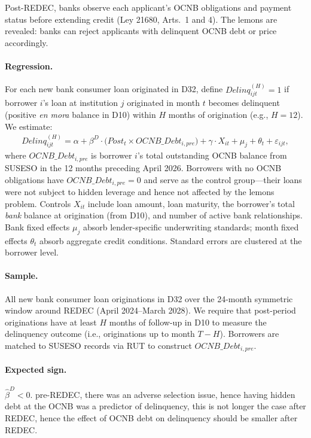 \documentclass[12pt]{article}
\theoremstyle{plain}
\theoremstyle{plain}
\begin{document}
Post-REDEC, banks observe each applicant's OCNB obligations and payment status before extending credit (Ley 21680, Arts.\ 1 and 4). The lemons are revealed: banks can reject applicants with delinquent OCNB debt or price accordingly.

\paragraph{Regression.}  For each new bank consumer loan originated in D32, define $Delinq_{ijt}^{(H)} = 1$ if borrower $i$'s loan at institution $j$ originated in month $t$ becomes delinquent (positive \textit{en mora} balance in D10) within $H$ months of origination (e.g., $H = 12$). We estimate:
\begin{align}
    Delinq_{ijt}^{(H)} = \alpha + \beta^{D} \cdot \bigl(Post_t \times OCNB\_Debt_{i,pre}\bigr) + \gamma \cdot X_{it} + \mu_j + \theta_t + \varepsilon_{ijt},
\label{eq:delinquency}
\end{align}
where $OCNB\_Debt_{i,pre}$ is borrower $i$'s total outstanding OCNB balance from SUSESO in the 12 months preceding April 2026. Borrowers with no OCNB obligations have $OCNB\_Debt_{i,pre} = 0$ and serve as the control group---their loans were not subject to hidden leverage and hence not affected by the lemons problem. Controls $X_{it}$ include loan amount, loan maturity, the borrower's total \textit{bank} balance at origination (from D10), and number of active bank relationships. Bank fixed effects $\mu_j$ absorb lender-specific underwriting standards; month fixed effects $\theta_t$ absorb aggregate credit conditions. Standard errors are clustered at the borrower level.

\paragraph{Sample.} All new bank consumer loan originations in D32 over the 24-month symmetric window around REDEC (April 2024--March 2028). We require that post-period originations have at least $H$ months of follow-up in D10 to measure the delinquency outcome (i.e., originations up to month $T - H$). Borrowers are matched to SUSESO records via RUT to construct $OCNB\_Debt_{i,pre}$.

\paragraph{Expected sign.} $\hat{\beta}^{D} < 0$.  pre-REDEC, there was an adverse selection issue, hence having hidden debt at the OCNB was a predictor of delinquency, this is not longer the case after REDEC, hence the effect of OCNB debt on delinquency should be smaller after REDEC. 
\end{document}
